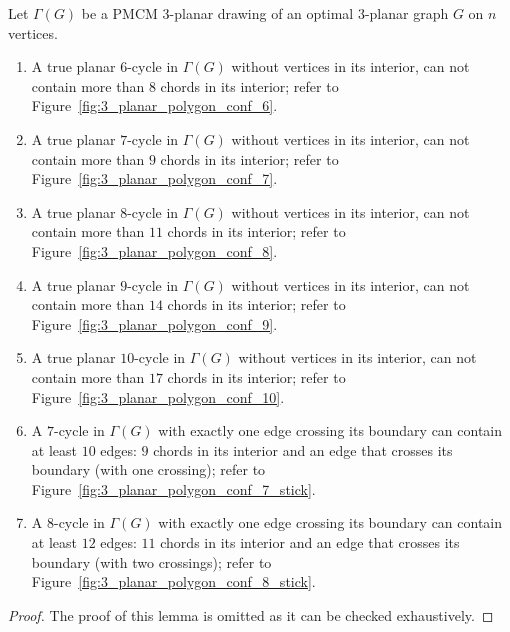 \begin{lemma}\label{lem:3_planar_true_planar}
Let $\Gamma(G)$ be a PMCM $3$-planar drawing of an optimal $3$-planar graph $G$ on $n$ vertices.
\begin{enumerate}
\item A true planar $6$-cycle in $\Gamma(G)$ without vertices in its interior, can not contain more than  $8$ chords in its interior; refer to Figure~\ref{fig:3_planar_polygon_conf_6}.
\item A true planar $7$-cycle in $\Gamma(G)$ without vertices in its interior, can not contain more than $9$ chords in its interior; refer to Figure~\ref{fig:3_planar_polygon_conf_7}.
\item A true planar $8$-cycle in $\Gamma(G)$ without vertices in its interior, can not contain more than $11$ chords in its interior; refer to Figure~\ref{fig:3_planar_polygon_conf_8}.
\item A true planar $9$-cycle in $\Gamma(G)$ without vertices in its interior, can not contain more than $14$ chords in its interior; refer to Figure~\ref{fig:3_planar_polygon_conf_9}.
\item A true planar $10$-cycle in $\Gamma(G)$ without vertices in its interior, can not contain more than $17$ chords in its interior; refer to Figure~\ref{fig:3_planar_polygon_conf_10}.
\item A $7$-cycle in $\Gamma(G)$ with exactly one edge crossing its boundary can contain at least $10$ edges: $9$ chords in its interior  and an edge that crosses its boundary (with one crossing); refer to Figure~\ref{fig:3_planar_polygon_conf_7_stick}.
\item A $8$-cycle in $\Gamma(G)$ with exactly one edge crossing its boundary can contain at least $12$ edges: $11$ chords in its interior and an edge that crosses its boundary (with two crossings); refer to Figure~\ref{fig:3_planar_polygon_conf_8_stick}.
\end{enumerate}
\end{lemma}
\begin{proof}
The proof of this lemma is omitted as it can be checked exhaustively.
\end{proof}

